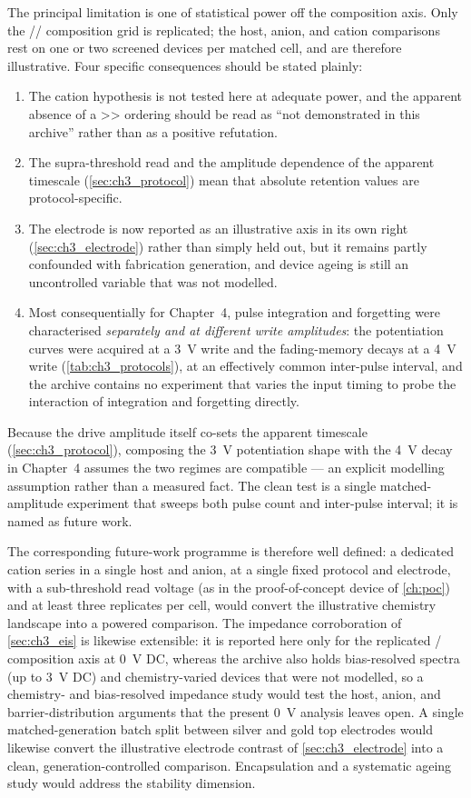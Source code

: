 \documentclass[12pt, twoside]{report}
\begin{document}
The principal limitation is one of statistical power off the composition axis. Only the \SY{}/\PEO{}/\LiTf{} composition grid is replicated; the host, anion, and cation comparisons rest on one or two screened devices per matched cell, and are therefore illustrative. Four specific consequences should be stated plainly:
\begin{enumerate}
  \item The cation hypothesis is not tested here at adequate power, and the apparent absence of a >> ordering should be read as ``not demonstrated in this archive'' rather than as a positive refutation.
  \item The supra-threshold read and the amplitude dependence of the apparent timescale (\cref{sec:ch3_protocol}) mean that absolute retention values are protocol-specific.
  \item The electrode is now reported as an illustrative axis in its own right (\cref{sec:ch3_electrode}) rather than simply held out, but it remains partly confounded with fabrication generation, and device ageing is still an uncontrolled variable that was not modelled.
  \item Most consequentially for Chapter~4, pulse integration and forgetting were characterised \emph{separately and at different write amplitudes}: the potentiation curves were acquired at a \SI{3}{\volt} write and the fading-memory decays at a \SI{4}{\volt} write (\cref{tab:ch3_protocols}), at an effectively common inter-pulse interval, and the archive contains no experiment that varies the input timing to probe the interaction of integration and forgetting directly.
\end{enumerate}
Because the drive amplitude itself co-sets the apparent timescale (\cref{sec:ch3_protocol}), composing the \SI{3}{\volt} potentiation shape with the \SI{4}{\volt} decay in Chapter~4 assumes the two regimes are compatible --- an explicit modelling assumption rather than a measured fact. The clean test is a single matched-amplitude experiment that sweeps both pulse count and inter-pulse interval; it is named as future work.

The corresponding future-work programme is therefore well defined: a dedicated cation series in a single host and anion, at a single fixed protocol and electrode, with a sub-threshold read voltage (as in the proof-of-concept device of \cref{ch:poc}) and at least three replicates per cell, would convert the illustrative chemistry landscape into a powered comparison. The impedance corroboration of \cref{sec:ch3_eis} is likewise extensible: it is reported here only for the replicated \PEO{}/\LiTf{} composition axis at \SI{0}{\volt} DC, whereas the archive also holds bias-resolved spectra (up to \SI{3}{\volt} DC) and chemistry-varied devices that were not modelled, so a chemistry- and bias-resolved impedance study would test the host, anion, and barrier-distribution arguments that the present \SI{0}{\volt} analysis leaves open. A single matched-generation batch split between silver and gold top electrodes would likewise convert the illustrative electrode contrast of \cref{sec:ch3_electrode} into a clean, generation-controlled comparison. Encapsulation and a systematic ageing study would address the stability dimension.
\end{document}
